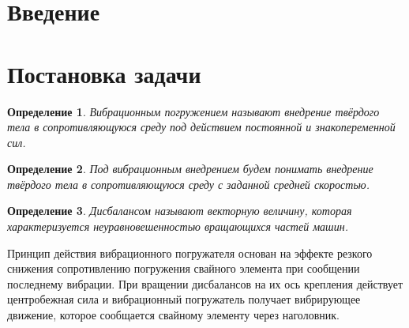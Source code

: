 \documentclass[14pt, a4paper]{extarticle}
\newtheorem{definition}{Определение}
\begin{document}
    \renewcommand\contentsname{Оглавление} %
    \tableofcontents
    \setcounter{page}{2}

    \pagebreak
    \section*{Введение}


    \clearpage
    \section{Постановка задачи}
    \begin{definition}
        Вибрационным погружением называют внедрение твёрдого тела в сопротивляющуюся среду под действием постоянной и знакопеременной сил.
    \end{definition}
    
    \begin{definition}
        Под вибрационным внедрением будем понимать внедрение твёрдого тела в сопротивляющуюся среду с заданной средней скоростью.
    \end{definition}

    \begin{definition}
        Дисбалансом называют векторную величину, которая характеризуется неуравновешенностью вращающихся частей машин.
    \end{definition}
    
    Принцип действия вибрационного погружателя основан на эффекте резкого снижения сопротивлению погружения свайного элемента при сообщении последнему вибрации. При вращении дисбалансов на их ось крепления действует центробежная сила и вибрационный погружатель получает вибрирующее движение, которое сообщается свайному элементу через наголовник.
\end{document}
